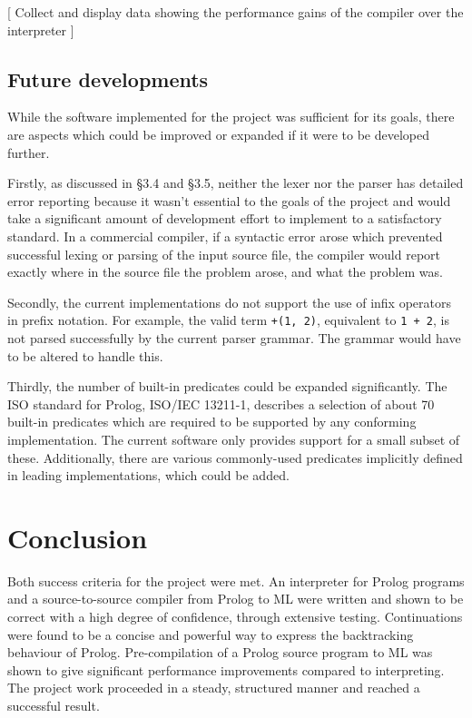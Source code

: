 \documentclass[12pt]{article}
\begin{document}
[ Collect and display data showing the performance gains of the compiler over the interpreter ]

\subsection{Future developments}

While the software implemented for the project was sufficient for its goals, there are aspects which could be improved or expanded if it were to be developed further.

Firstly, as discussed in \S3.4 and \S3.5, neither the lexer nor the parser has detailed error reporting because it wasn't essential to the goals of the project and would take a significant amount of development effort to implement to a satisfactory standard. 
In a commercial compiler, if a syntactic error arose which prevented successful lexing or parsing of the input source file, the compiler would report exactly where in the source file the problem arose, and what the problem was.

Secondly, the current implementations do not support the use of infix operators in prefix notation. 
For example, the valid term \verb|+(1, 2)|, equivalent to \verb|1 + 2|, is not parsed successfully by the current parser grammar. 
The grammar would have to be altered to handle this.

Thirdly, the number of built-in predicates could be expanded significantly. 
The ISO standard for Prolog, ISO/IEC 13211-1, describes a selection of about 70 built-in predicates which are required to be supported by any conforming implementation. 
The current software only provides support for a small subset of these.
Additionally, there are various commonly-used predicates implicitly defined in leading implementations, which could be added.

\newpage

\section{Conclusion}

Both success criteria for the project were met. An interpreter for Prolog programs and a source-to-source compiler from Prolog to ML were written and shown to be correct with a high degree of confidence, through extensive testing. Continuations were found to be a concise and powerful way to express the backtracking behaviour of Prolog. Pre-compilation of a Prolog source program to ML was shown to give significant performance improvements compared to interpreting. The project work proceeded in a steady, structured manner and reached a successful result. 
\end{document}
